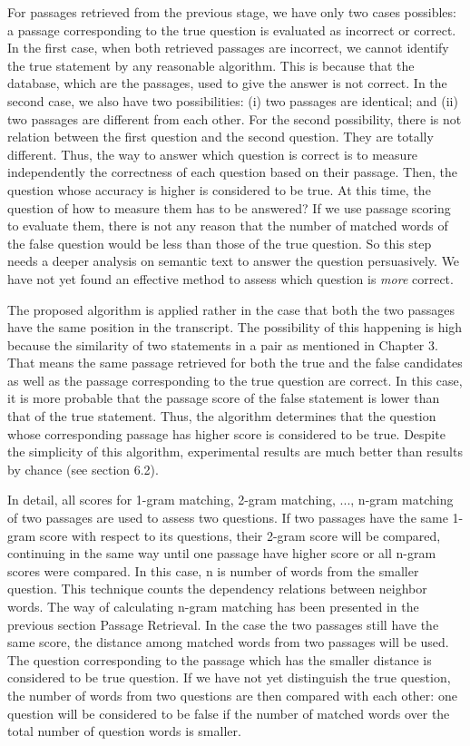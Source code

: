 For passages retrieved from the previous stage, we have only two cases possibles: a passage corresponding to the true question is evaluated as incorrect or correct. In the first case, when both retrieved passages are incorrect, we cannot identify the true statement by any reasonable algorithm. This is because that the database, which are the passages, used to give the answer is not correct. In the second case, we also have two possibilities: (i) two passages are identical; and (ii) two passages are different from each other. For the second possibility, there is not relation between the first question and the second question. They are totally different. Thus, the way to answer which question is correct is to measure independently the correctness of each question based on their passage. Then, the question whose accuracy is higher is considered to be true. At this time, the question of how to measure them has to be answered? If we use passage scoring to evaluate them, there is not any reason that the number of matched words of the false question would be less than those of the true question. So this step needs a deeper analysis on semantic text to answer the question persuasively. We have not yet found an effective method to assess which question is \textit{more} correct.

The proposed algorithm is applied rather in the case that both the two passages have the same position in the transcript. The possibility of this happening is high because the similarity of two statements in a pair as mentioned in Chapter 3. That means the same passage retrieved for both the true and the false candidates as well as the passage corresponding to the true question are correct. In this case, it is more probable that the passage score of the false statement is lower than that of the true statement. Thus, the algorithm determines that the question whose corresponding passage has higher score is considered to be true. Despite the simplicity of this algorithm, experimental results are much better than results by chance (see section 6.2).

In detail, all scores for 1-gram matching, 2-gram matching, ..., n-gram matching of two passages are used to assess two questions. If two passages have the same 1-gram score with respect to its questions, their 2-gram score will be compared, continuing in the same way until one passage have higher score or all n-gram scores were compared. In this case, n is number of words from the smaller question. This technique counts the dependency relations between neighbor words. The way of calculating n-gram matching has been presented in the previous section Passage Retrieval. In the case the two passages still have the same score, the distance among matched words from two passages will be used. The question corresponding to the passage which has the smaller distance is considered to be true question. If we have not yet distinguish the true question, the number of words from two questions are then compared with each other: one question will be considered to be false if the number of matched words over the total number of question words is smaller.

